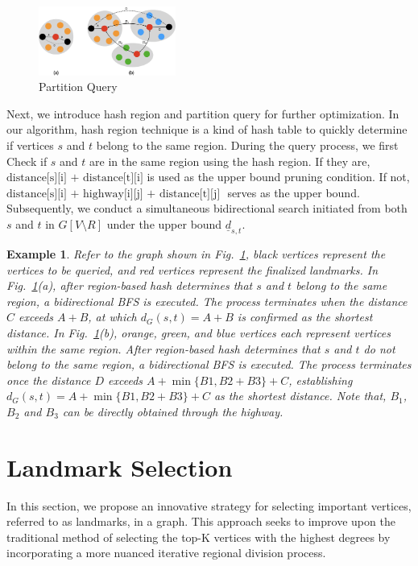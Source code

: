 \documentclass[sigconf]{acmart}
\newtheorem{example}{Example}
\begin{document}
\begin{figure}
\centering
\includegraphics[width=0.4\textwidth]{figures/4-2-query-fram.png}
\caption{Partition Query} 
\label{fig5}
\end{figure}

%
%
Next, we introduce hash region and partition query for further optimization. In our algorithm, hash region technique is a kind of hash table to quickly determine if vertices $s$ and $t$ belong to the same region. During the query process, we first Check if $s$ and $t$ are in the same region using the hash region. If they are, $\text {distance[s][i] + distance[t][i]}$ is used as the upper bound pruning condition. If not, $\text {distance[s][i] + highway[i][j] + distance[t][j] }$ serves as the upper bound. Subsequently, we conduct a simultaneous bidirectional search initiated from both $s$ and $t$ in $G[V \setminus R]$ under the upper bound $\underline{d}_{s,t}$. \par
%

\begin{example}
   Refer to the graph shown in Fig.~\ref{fig5}, black vertices represent the vertices to be queried, and red vertices represent the finalized landmarks. In Fig.~\ref{fig5}(a), after region-based hash determines that $s$ and $t$ belong to the same region, a bidirectional BFS is executed. The process terminates when the distance $C$ exceeds $A + B$, at which $d_{G}(s, t)=A+B$ is confirmed as the shortest distance. In Fig.~\ref{fig5}(b), orange, green, and blue vertices each represent vertices within the same region. After region-based hash determines that $s$ and $t$ do not belong to the same region, a bidirectional BFS is executed. The process terminates once the distance $D$ exceeds $A+\min \{B 1, B 2+B 3\}+C$, establishing $d_{G}(s, t)=A+\min \{B 1, B 2+B 3\}+C$ as the shortest distance. Note that, $B_{1}$, $B_{2}$ and $B_{3}$ can be directly obtained through the highway. 
\end{example}

%
%
\section{Landmark Selection}
\label{sec:landmark_selection}
In this section, we propose an innovative strategy for selecting important vertices, referred to as landmarks, in a graph. This approach seeks to improve upon the traditional method of selecting the top-K vertices with the highest degrees by incorporating a more nuanced iterative regional division process. \par
\end{document}

